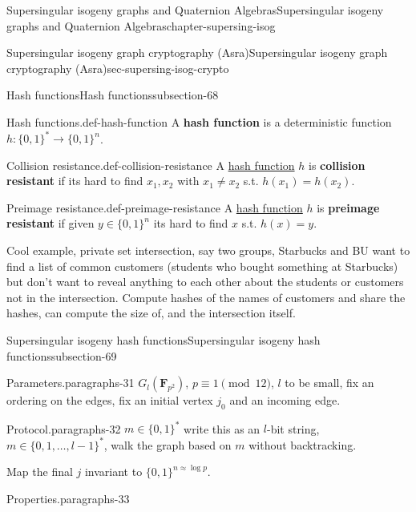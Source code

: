 \documentclass[oneside,10pt,]{book}
\newcommand{\terminology}[1]{\textbf{#1}}
\numberwithin{equation}{section}
\newcommand{\FF}{\mathbf{F}}
\begin{document}
\begin{chapterptx}{Supersingular isogeny graphs and Quaternion Algebras}{}{Supersingular isogeny graphs and Quaternion Algebras}{}{}{chapter-supersing-isog}
\begin{sectionptx}{Supersingular isogeny graph cryptography (Asra)}{}{Supersingular isogeny graph cryptography (Asra)}{}{}{sec-supersing-isog-crypto}
\begin{subsectionptx}{Hash functions}{}{Hash functions}{}{}{subsection-68}
\begin{definition}{Hash functions.}{def-hash-function}%
\hypertarget{p-830}{}%
A \terminology{hash function} is a deterministic function \(h\colon \{0,1\}^* \to \{0,1\}^n\).%
\end{definition}
\begin{definition}{Collision resistance.}{def-collision-resistance}%
\hypertarget{p-831}{}%
A \hyperref[def-hash-function]{hash function} \(h\) is \terminology{collision resistant} if its hard to find \(x_1,x_2\) with \(x_1\ne x_2 \) s.t. \(h(x_1) = h(x_2)\).%
\end{definition}
\begin{definition}{Preimage resistance.}{def-preimage-resistance}%
\hypertarget{p-832}{}%
A \hyperref[def-hash-function]{hash function} \(h\) is \terminology{preimage resistant} if given \(y\in \{0,1\}^n\) its hard to find \(x\) s.t. \(h(x) = y\).%
\end{definition}
\hypertarget{p-833}{}%
Cool example, private set intersection, say two groups, Starbucks and BU want to find a list of common customers (students who bought something at Starbucks) but don't want to reveal anything to each other about the students or customers not in the intersection. Compute hashes of the names of customers and share the hashes, can compute the size of, and the intersection itself.%
\end{subsectionptx}
%
%
\typeout{************************************************}
\typeout{************************************************}
%
\begin{subsectionptx}{Supersingular isogeny hash functions}{}{Supersingular isogeny hash functions}{}{}{subsection-69}
\begin{paragraphs}{Parameters.}{paragraphs-31}%
\hypertarget{p-834}{}%
\(G_l(\FF_{p^2})\), \(p \equiv 1 \pmod{12}\), \(l\) to be small, fix an ordering on the edges, fix an initial vertex \(j_0\) and an incoming edge.%
\end{paragraphs}%
\begin{paragraphs}{Protocol.}{paragraphs-32}%
\hypertarget{p-835}{}%
\(m \in \{0,1\}^*\) write this as an \(l\)-bit string, \(m \in \{0,1,\ldots, l-1\}^*\), walk the graph based on \(m\) without backtracking.%
\par
\hypertarget{p-836}{}%
Map the final \(j\) invariant to  \(\{0,1\}^{n\approx \log p}\).%
\end{paragraphs}%
\begin{paragraphs}{Properties.}{paragraphs-33}%

\end{paragraphs}
\end{subsectionptx}
\end{sectionptx}
\end{chapterptx}
\end{document}
